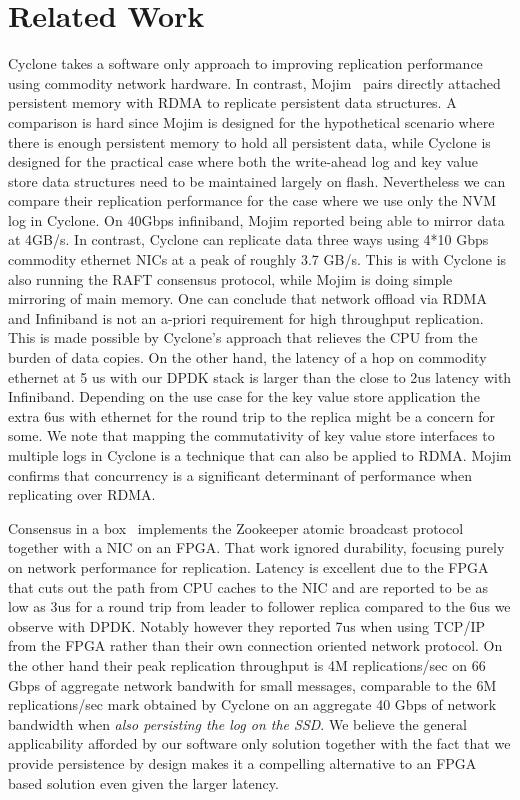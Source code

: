 \documentclass[pageno]{jpaper}
\begin{document}
\section{Related Work}

Cyclone takes a software only approach to improving replication performance
using commodity network hardware. In contrast, Mojim~\cite{mojim} pairs directly
attached persistent memory with RDMA to replicate persistent data structures. A
comparison is hard since Mojim is designed for the hypothetical scenario where
there is enough persistent memory to hold all persistent data, while Cyclone is
designed for the practical case where both the write-ahead log and key value
store data structures need to be maintained largely on flash. Nevertheless we
can compare their replication performance for the case where we use only the NVM
log in Cyclone. On 40Gbps infiniband, Mojim reported being able to mirror data
at 4GB/s. In contrast, Cyclone can replicate data three ways using 4*10 Gbps
commodity ethernet NICs at a peak of roughly 3.7 GB/s. This is with
Cyclone is also running the RAFT consensus protocol, while Mojim is doing simple
mirroring of main memory. One can conclude that network offload via RDMA and
Infiniband is not an a-priori requirement for high throughput replication. This
is made possible by Cyclone's approach that relieves the CPU from the burden of
data copies. On the other hand, the latency of a hop on commodity ethernet at 5 us with
our DPDK stack is larger than the close to 2us latency with
Infiniband. Depending on the use case for the key value store application the
extra 6us with ethernet for the round trip to the replica might be a concern for
some. We note that mapping the commutativity of key value store
interfaces to multiple logs in Cyclone is a technique that can also be applied
to RDMA. Mojim confirms that concurrency is a significant
determinant of performance when replicating over RDMA.

Consensus in a box~\cite{consensus_box} implements the Zookeeper atomic
broadcast protocol together with a NIC on an FPGA. That work ignored durability,
focusing purely on network performance for replication. Latency is excellent due
to the FPGA that cuts out the path from CPU caches to the NIC and are reported
to be as low as 3us for a round trip from leader to follower replica compared to
the 6us we observe with DPDK. Notably however they reported 7us when using
TCP/IP from the FPGA rather than their own connection oriented network
protocol. On the other hand their peak replication throughput is 4M
replications/sec on 66 Gbps of aggregate network bandwith for small messages,
comparable to the 6M replications/sec mark obtained by Cyclone on an aggregate
40 Gbps of network bandwidth when \emph{also persisting the log on the SSD}. We
believe the general applicability afforded by our software only solution
together with the fact that we provide persistence by design makes it a
compelling alternative to an FPGA based solution even given the larger latency.
\end{document}
